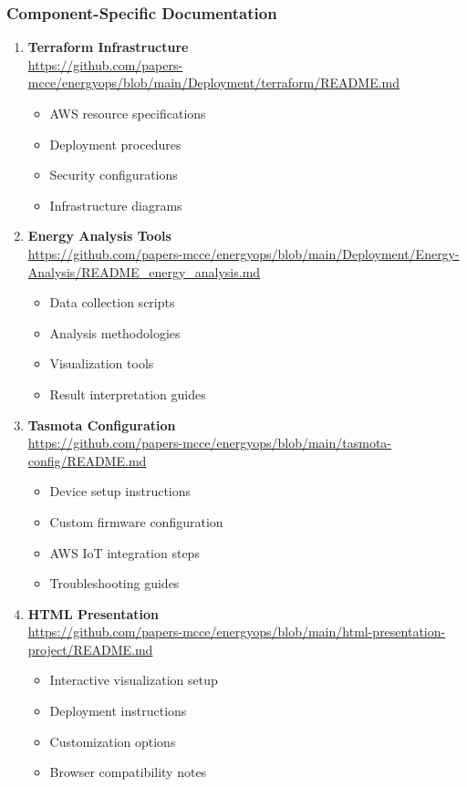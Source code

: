 \subsubsection{Component-Specific Documentation}
\begin{enumerate}
    \item \textbf{Terraform Infrastructure} \\
    \url{https://github.com/papers-mcce/energyops/blob/main/Deployment/terraform/README.md}
    \begin{itemize}
        \item AWS resource specifications
        \item Deployment procedures
        \item Security configurations
        \item Infrastructure diagrams
    \end{itemize}

    \item \textbf{Energy Analysis Tools} \\
    \label{appendix:energy-analysis}
    \url{https://github.com/papers-mcce/energyops/blob/main/Deployment/Energy-Analysis/README_energy_analysis.md}
    \begin{itemize}
        \item Data collection scripts
        \item Analysis methodologies
        \item Visualization tools
        \item Result interpretation guides
    \end{itemize}

    \item \textbf{Tasmota Configuration} \\
    \url{https://github.com/papers-mcce/energyops/blob/main/tasmota-config/README.md}
    \begin{itemize}
        \item Device setup instructions
        \item Custom firmware configuration
        \item AWS IoT integration steps
        \item Troubleshooting guides
    \end{itemize}

    \item \textbf{HTML Presentation} \\
    \url{https://github.com/papers-mcce/energyops/blob/main/html-presentation-project/README.md}
    \begin{itemize}
        \item Interactive visualization setup
        \item Deployment instructions
        \item Customization options
        \item Browser compatibility notes
    \end{itemize}
\end{enumerate}

